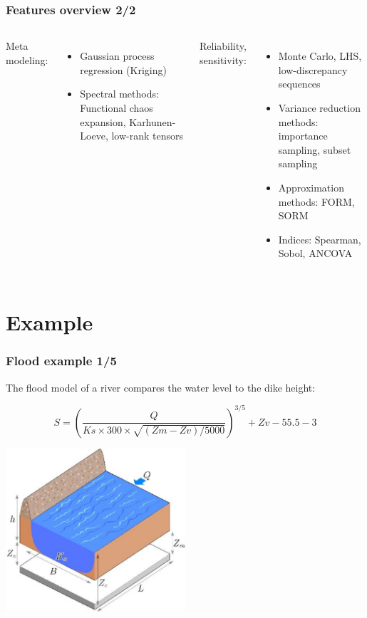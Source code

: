 \documentclass{beamer}
\begin{document}

\begin{frame}[containsverbatim]
\frametitle{Features overview 2/2}

  \begin{columns}
Meta modeling:
\begin{itemize}
\item Gaussian process regression (Kriging)
\item Spectral methods: Functional chaos expansion, Karhunen-Loeve, low-rank tensors
\end{itemize}


Reliability, sensitivity:
\begin{itemize}
\item Monte Carlo, LHS, low-discrepancy sequences
\item Variance reduction methods: importance sampling, subset sampling
\item Approximation methods: FORM, SORM
\item Indices: Spearman, Sobol, ANCOVA
\end{itemize}

\end{columns}

\end{frame}



\section{Example}

\begin{frame}[containsverbatim]
\frametitle{Flood example 1/5}

The flood model of a river compares the water level to the dike height:

$$S = \left(\frac{Q}{Ks\times300\times\sqrt{(Zm-Zv)/5000}}\right)^{3/5}+Zv-55.5-3$$


\begin{center}
\includegraphics[width=0.5\textwidth]{figures/crue}
\end{center}

\end{frame}
\end{document}
